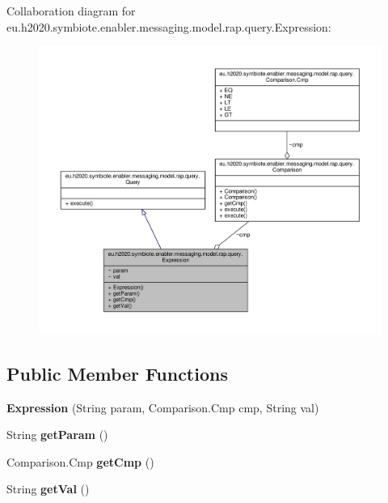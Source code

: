Collaboration diagram for eu.\+h2020.\+symbiote.\+enabler.\+messaging.\+model.\+rap.\+query.\+Expression\+:
\nopagebreak
\begin{figure}[H]
\begin{center}
\leavevmode
\includegraphics[width=350pt]{classeu_1_1h2020_1_1symbiote_1_1enabler_1_1messaging_1_1model_1_1rap_1_1query_1_1Expression__coll__graph}
\end{center}
\end{figure}
\subsection*{Public Member Functions}
\begin{DoxyCompactItemize}
\item 
\mbox{\label{classeu_1_1h2020_1_1symbiote_1_1enabler_1_1messaging_1_1model_1_1rap_1_1query_1_1Expression_ac68d427f6de95d25c8068f8460c10d9d}} 
{\bfseries Expression} (String param, Comparison.\+Cmp cmp, String val)
\item 
\mbox{\label{classeu_1_1h2020_1_1symbiote_1_1enabler_1_1messaging_1_1model_1_1rap_1_1query_1_1Expression_a2ed637b5da7b5fb7842e49d22131e724}} 
String {\bfseries get\+Param} ()
\item 
\mbox{\label{classeu_1_1h2020_1_1symbiote_1_1enabler_1_1messaging_1_1model_1_1rap_1_1query_1_1Expression_a46204e8dc6fe874e6684e19c816a4a08}} 
Comparison.\+Cmp {\bfseries get\+Cmp} ()
\item 
\mbox{\label{classeu_1_1h2020_1_1symbiote_1_1enabler_1_1messaging_1_1model_1_1rap_1_1query_1_1Expression_ad4c16a94be23b9a900c9b3c5deeed5cc}} 
String {\bfseries get\+Val} ()
\end{DoxyCompactItemize}


